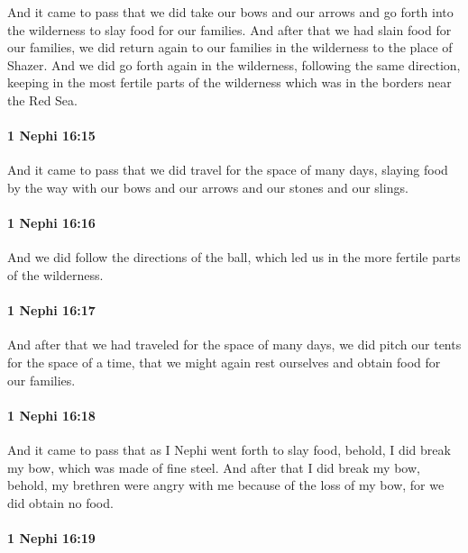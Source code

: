 			And it came to pass that we did take our bows and our arrows
			and go forth into the wilderness to slay food for our families.
			And after that we had slain food for our families,
			we did return again to our families in the wilderness to the place of Shazer.
			And we did go forth again in the wilderness, following the same direction,
			keeping in the most fertile parts of the wilderness
			which was in the borders near the Red Sea.

		\paragraph{1 Nephi 16:15} %
			\label{1NEPHI-16-15}

			And it came to pass that we did travel for the space of many days,
			slaying food by the way
			with our bows and our arrows and our stones and our slings.

		\paragraph{1 Nephi 16:16} %
			\label{1NEPHI-16-16}

			And we did follow the directions of the ball,
			which led us in the more fertile parts of the wilderness.

		\paragraph{1 Nephi 16:17} %
			\label{1NEPHI-16-17}

			And after that we had traveled for the space of many days,
			we did pitch our tents for the space of a time,
			that we might again rest ourselves and obtain food for our families.

		\paragraph{1 Nephi 16:18} %
			\label{1NEPHI-16-18}

			And it came to pass that as I Nephi went forth to slay food,
			behold, I did break my bow, which was made of fine steel.
			And after that I did break my bow,
			behold, my brethren were angry with me because of the loss of my bow,
			for we did obtain no food.

		\paragraph{1 Nephi 16:19} %
			\label{1NEPHI-16-19}

